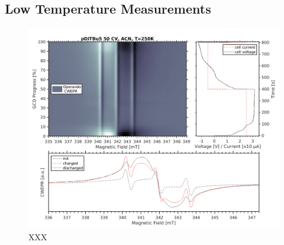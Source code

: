 \subsection{Low Temperature Measurements}
\begin{figure}[h]
\center
	\includegraphics[width=1\textwidth]{./operando_epr/figures/slowcharge_231117_liquid_250K.pdf}
	\caption{XXX}
	\label{fig:Figure_1}
\end{figure}

